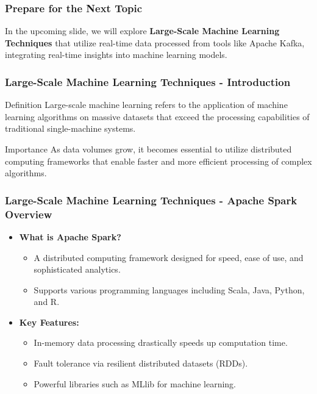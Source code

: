 \documentclass[aspectratio=169]{beamer}
\begin{document}
\begin{frame}[fragile]
    \frametitle{Prepare for the Next Topic}
    In the upcoming slide, we will explore \textbf{Large-Scale Machine Learning Techniques} that utilize real-time data processed from tools like Apache Kafka, integrating real-time insights into machine learning models.
\end{frame}

\begin{frame}[fragile]
    \frametitle{Large-Scale Machine Learning Techniques - Introduction}
    \begin{block}{Definition}
        Large-scale machine learning refers to the application of machine learning algorithms on massive datasets that exceed the processing capabilities of traditional single-machine systems.
    \end{block}
    \begin{block}{Importance}
        As data volumes grow, it becomes essential to utilize distributed computing frameworks that enable faster and more efficient processing of complex algorithms.
    \end{block}
\end{frame}

\begin{frame}[fragile]
    \frametitle{Large-Scale Machine Learning Techniques - Apache Spark Overview}
    \begin{itemize}
        \item \textbf{What is Apache Spark?}
        \begin{itemize}
            \item A distributed computing framework designed for speed, ease of use, and sophisticated analytics.
            \item Supports various programming languages including Scala, Java, Python, and R.
        \end{itemize}
        \item \textbf{Key Features:}
        \begin{itemize}
            \item In-memory data processing drastically speeds up computation time.
            \item Fault tolerance via resilient distributed datasets (RDDs).
            \item Powerful libraries such as MLlib for machine learning.
        \end{itemize}
    \end{itemize}
\end{frame}
\end{document}
